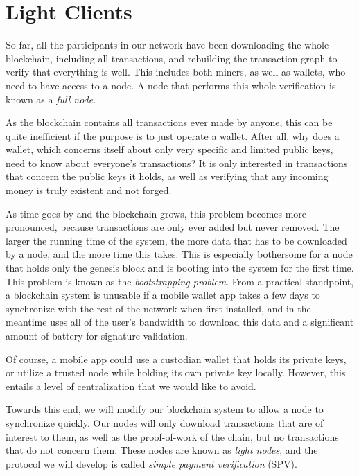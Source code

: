 \chapter{Light Clients}\label{chapter.light}

So far, all the participants in our network have been downloading the whole blockchain,
including all transactions, and rebuilding the transaction graph to verify that everything
is well. This includes both miners, as well as wallets, who need to have access to a node.
A node that performs this whole verification is known as a \emph{full node}.

As the blockchain contains all transactions ever made by anyone, this can be quite inefficient
if the purpose is to just operate a wallet. After all,
why does a wallet, which concerns itself about only very specific and limited public keys,
need to know about everyone's transactions? It is only interested in transactions that concern
the public keys it holds, as well as verifying that any incoming money is truly existent and
not forged.

As time goes by and the blockchain grows, this problem becomes more pronounced, because transactions
are only ever added but never removed. The larger the running time of the system, the more data
that has to be downloaded by a node, and the more time this takes.
This is especially bothersome for a node that holds only the genesis
block and is booting into the system for the first time. This problem is known as the
\emph{bootstrapping problem}.
From a practical standpoint, a blockchain system is unusable if a mobile wallet app takes
a few days to synchronize with the rest of the network when first installed, and in the meantime
uses all of the user's bandwidth to download this data and a significant amount of battery
for signature validation.

Of course, a mobile app could use a custodian wallet that holds its private keys, or
utilize a trusted node while holding its own private key locally. However, this entails
a level of centralization that we would like to avoid.

Towards this end, we will modify our blockchain system to allow a node to
synchronize quickly. Our nodes will only download transactions that are of interest
to them, as well as the proof-of-work of the chain, but no transactions that do not
concern them.
These nodes are known as \emph{light nodes}, and the protocol
we will develop is called \emph{simple payment verification} (SPV).

